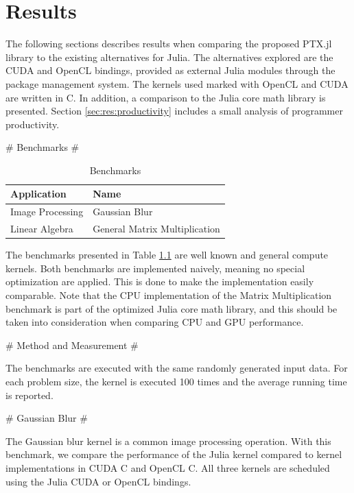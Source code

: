 \chapter{Results}
\label{chap:res}

\begin{markdown}

The following sections describes results when comparing the proposed
PTX.jl library to the existing alternatives for Julia. The
alternatives explored are the CUDA and OpenCL bindings, provided as
external Julia modules through the package management system. The
kernels used marked with OpenCL and CUDA are written in C. In
addition, a comparison to the Julia core math library is presented.
Section \ref{sec:res:productivity} includes a small analysis of
programmer productivity.

# Benchmarks #
\label{sec:res:bench}

\begin{table}[H]
  \centering
  \begin{tabular}{|l|l|}
    \hline
    Application & Name \\
    \hline
    Image Processing & Gaussian Blur \\
    \hline
    Linear Algebra & General Matrix Multiplication \\
    \hline
  \end{tabular}
  \caption{Benchmarks}
  \label{res:benchmarks}
\end{table}

The benchmarks presented in Table \ref{res:benchmarks} are well known
and general compute kernels. Both benchmarks are implemented naively,
meaning no special optimization are applied. This is done to make the
implementation easily comparable. Note that the CPU implementation of
the Matrix Multiplication benchmark is part of the optimized Julia
core math library, and this should be taken into consideration when
comparing CPU and GPU performance.

# Method and Measurement #
\label{sec:res:measure}

The benchmarks are executed with the same randomly generated input
data. For each problem size, the kernel is executed 100 times and the
average running time is reported.

# Gaussian Blur #

The Gaussian blur kernel is a common image processing operation. With
this benchmark, we compare the performance of the Julia kernel compared
to kernel implementations in CUDA C and OpenCL C. All three kernels are
scheduled using the Julia CUDA or OpenCL bindings. 


\end{markdown}
